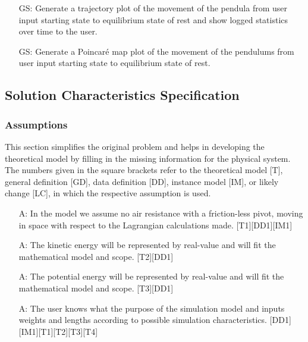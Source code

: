 \documentclass[12pt]{article}
\newcounter{assumpnum} %
\newcounter{goalnum} %
\begin{document}

\begin{itemize}
\item[GS\refstepcounter{goalnum}\thegoalnum:] Generate a trajectory plot of 
the movement of the pendula from user input starting state to equilibrium 
state of rest and show logged statistics over time to the user. 
\item[GS\refstepcounter{goalnum}\thegoalnum:] Generate a Poincaré map plot of 
the movement of the pendulums from user input starting state to equilibrium 
state of rest.
\end{itemize}


\newpage

\subsection{Solution Characteristics Specification}

\subsubsection{Assumptions}

This section simplifies the original problem and helps in developing the
theoretical model by filling in the missing information for the physical
system. The numbers given in the square brackets refer to the theoretical model
[T], general definition [GD], data definition [DD], instance model [IM], or
likely change [LC], in which the respective assumption is used.

\begin{itemize}
\item[A\refstepcounter{assumpnum}\theassumpnum \label{A:equation}:]
In the model we assume no air resistance with a friction-less pivot, moving in
space with respect to the Lagrangian calculations made. [T1][DD1][IM1] 
\item[A\refstepcounter{assumpnum}\theassumpnum \label{A:kinetic}:]
  The kinetic energy will be represented by real-value and will fit the 
mathematical model and scope. [T2][DD1]
\item[A\refstepcounter{assumpnum}\theassumpnum \label{A:poten}:]
  The potential energy will be represented by real-value and will fit the 
mathematical model and scope. [T3][DD1]
\item[A\refstepcounter{assumpnum}\theassumpnum \label{A:init-user}:]
The user knows what the purpose of the simulation model and inputs weights and 
lengths according to possible simulation characteristics. 
[DD1][IM1][T1][T2][T3][T4]
\end{itemize}
\end{document}
